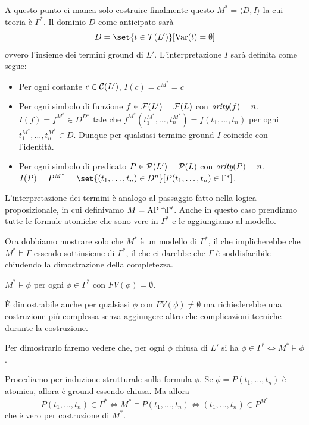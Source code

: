 A questo punto ci manca solo costruire finalmente questo \(M^* = \langle D, I\rangle\) la cui teoria è  \(\Gamma^*\). Il dominio \(D\) come anticipato sarà
\[D = \set{t\in \Terms(L')}[\Var(t) = \emptyset]\]
ovvero l'insieme dei termini ground di \(L'\). L'interpretazione \(I\) sarà definita come segue:
\begin{itemize}
  \item Per ogni costante \(c\in \mathcal{C}(L')\), \(I(c) = c^{M^*} = c\)
  \item Per ogni simbolo di funzione \(f\in \mathcal{F}(L') = \mathcal{F}(L)\) con \(\operatorname{\textit{arity}}(f) = n\), \(I(f) = f^{M^*} \in D^{D^n}\) tale che \(f^{M^*}(t_1^{M^*}, \ldots, t_n^{M^*}) = f(t_1, \ldots, t_n)\) per ogni \(t_1^{M^*}, \ldots, t_n^{M^*} \in D\). Dunque per qualsiasi termine ground \(I\) coincide con l'identità.
  \item Per ogni simbolo di predicato \(P\in \mathcal{P}(L') = \mathcal{P}(L)\) con \(\operatorname{\textit{arity}}(P) = n\), \(I(P) = P^{M^*} =\set{(t_1, \ldots, t_n) \in D^n}[P(t_1, \ldots, t_n) \in \Gamma^*]\).
\end{itemize}

L'interpretazione dei termini è analogo al passaggio fatto nella logica proposizionale, in cui definivamo \(M = \AP\cap\Gamma'\). Anche in questo caso prendiamo tutte le formule atomiche che sono vere in \(\Gamma^*\) e le aggiungiamo al modello.

Ora dobbiamo mostrare solo che \(M^*\) è un modello di \(\Gamma^*\), il che implicherebbe che \(M^*\models \Gamma\) essendo sottinsieme di \(\Gamma^*\), il che ci darebbe che \(\Gamma\) è soddisfacibile chiudendo la dimostrazione della completezza.

\begin{theorem}{}
  \(M^* \models \phi\) per ogni \(\phi \in \Gamma^*\) con \(FV(\phi) = \emptyset\).
\end{theorem}

\begin{note}{}
  È dimostrabile anche per qualsiasi \(\phi\) con \(FV(\phi) \neq \emptyset\) ma richiederebbe una costruzione più complessa senza aggiungere altro che complicazioni tecniche durante la costruzione.
\end{note}

Per dimostrarlo faremo vedere che, per ogni \(\phi\) chiusa di \(L'\) si ha \(\phi \in \Gamma^* \iff M^* \models \phi\).

Procediamo per induzione strutturale sulla formula \(\phi\). Se \(\phi = P(t_1, \ldots, t_n)\) è atomica, allora è ground essendo chiusa. Ma allora
\[P(t_1, \ldots, t_n) \in \Gamma^* \iff M^* \models P(t_1, \ldots, t_n) \iff (t_1, \ldots, t_n) \in P^{M^*}\]
che è vero per costruzione di \(M^*\).

